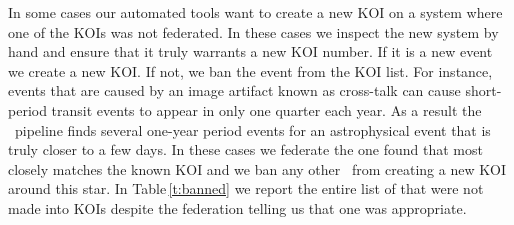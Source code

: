 In some cases our automated tools want to create a new KOI on a system where one of the KOIs was not federated.  In these cases we inspect the new system by hand and ensure that it truly warrants a new KOI number. If it is a new event we create a new KOI. If not, we ban the event from the KOI list.  For instance, events that are caused by an image artifact known as cross-talk \citet{Coughlin2014a} can cause short-period transit events to appear in only one quarter each year. As a result the \Kepler\ pipeline finds several one-year period events for an astrophysical event that is truly closer to a few days.  In these cases we federate the one found that most closely matches the known KOI and we ban any other \opstce\ from creating a new KOI around this star. In Table\,\ref{t:banned} we report the entire list of  that were not made into KOIs despite the federation telling us that one was appropriate.


